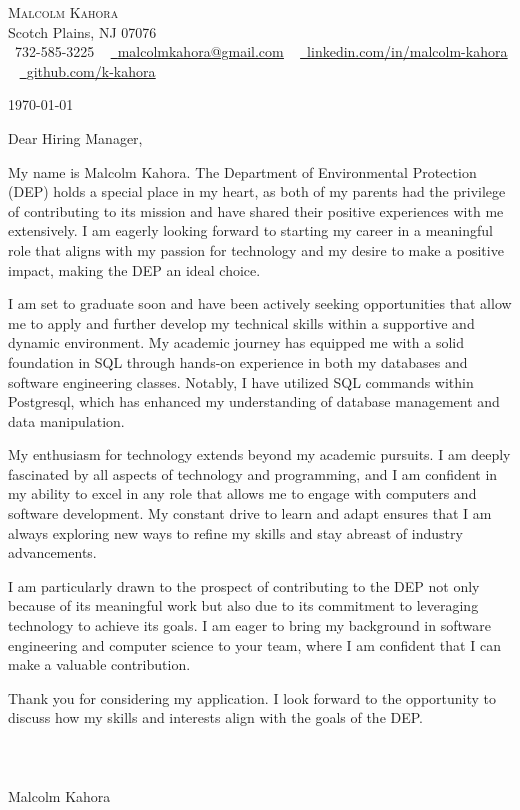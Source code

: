 \documentclass[letterpaper,11pt]{article}
\begin{document}
\begin{center}
    {\Huge \scshape Malcolm Kahora} \\ \vspace{1pt}
    Scotch Plains, NJ 07076 \\ \vspace{1pt}
    \small \raisebox{-0.1\height}\faPhone\ 732-585-3225 ~ \href{mailto:malcolmkahora@gmail.com}{\raisebox{-0.2\height}\faEnvelope\  \underline{malcolmkahora@gmail.com}} ~ 
    \href{https://linkedin.com/in/malcolm-kahora/}{\raisebox{-0.2\height}\faLinkedin\ \underline{linkedin.com/in/malcolm-kahora}}  ~
    \href{https://github.com/k-kahora}{\raisebox{-0.2\height}\faGithub\ \underline{github.com/k-kahora}}
    \vspace{-8pt}
\end{center}

\today

Dear Hiring Manager,

My name is Malcolm Kahora. The Department of Environmental Protection (DEP) holds a special place in my heart, as both of my parents had the privilege of contributing to its mission and have shared their positive experiences with me extensively. I am eagerly looking forward to starting my career in a meaningful role that aligns with my passion for technology and my desire to make a positive impact, making the DEP an ideal choice.

I am set to graduate soon and have been actively seeking opportunities that allow me to apply and further develop my technical skills within a supportive and dynamic environment. My academic journey has equipped me with a solid foundation in SQL through hands-on experience in both my databases and software engineering classes. Notably, I have utilized SQL commands within Postgresql, which has enhanced my understanding of database management and data manipulation.

My enthusiasm for technology extends beyond my academic pursuits. I am deeply fascinated by all aspects of technology and programming, and I am confident in my ability to excel in any role that allows me to engage with computers and software development. My constant drive to learn and adapt ensures that I am always exploring new ways to refine my skills and stay abreast of industry advancements.

I am particularly drawn to the prospect of contributing to the DEP not only because of its meaningful work but also due to its commitment to leveraging technology to achieve its goals. I am eager to bring my background in software engineering and computer science to your team, where I am confident that I can make a valuable contribution.

Thank you for considering my application. I look forward to the opportunity to discuss how my skills and interests align with the goals of the DEP. \\
\\
\\
\\
\vspace{50pt}
Malcolm Kahora
\end{document}
